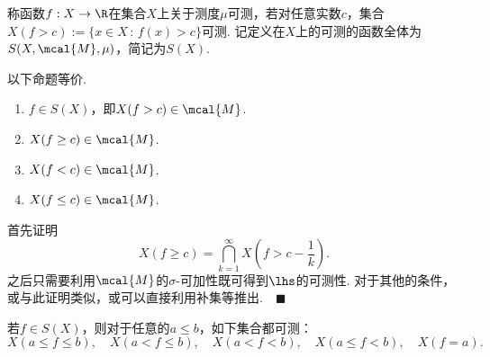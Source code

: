    \begin{defi}[可测]
     称函数$f:X\to\R$在集合$X$上关于测度$\mu$可测，若对任意实数$c$，集合$X(f>c):=\{x\in X
     \,:\,f(x)>c\}$可测. 记定义在$X$上的可测的函数全体为$S(X,\mcal{M}, \mu)$，简记为$S(X)$.
   \end{defi}

  \begin{lemma}
    以下命题等价.
    \begin{enumerate}
      \item $f\in S(X)$，即$X(f>c)\in\mcal{M}$.
      \item $X(f\ge c)\in\mcal{M}$.
      \item $X(f<c)\in\mcal{M}$.
      \item $X(f\le c)\in\mcal{M}$.
    \end{enumerate}
  \end{lemma}
  \proof
    首先证明
    \[
      X(f\ge c) = \bigcap_{k=1}^\infty X\left(f>c-\frac{1}{k}\right).
    \]
    之后只需要利用$\mcal{M}$的$\sigma$-可加性既可得到$\lhs$的可测性. 对于其他的条件，
    或与此证明类似，或可以直接利用补集等推出.$\quad\blacksquare$

  \begin{cor}
    若$f\in S(X)$，则对于任意的$a\le b$，如下集合都可测：
    \[
      X(a\le f\le b),\quad X(a<f\le b),\quad X(a<f<b),\quad X(a\le f<b), \quad 
      X(f=a).
    \]
  \end{cor}





